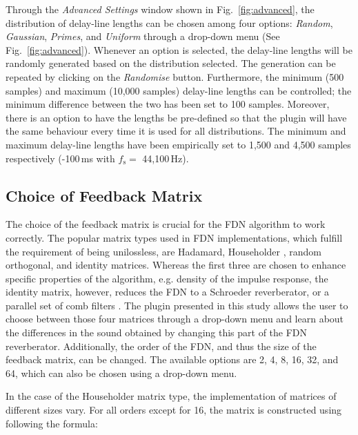 \documentclass[twoside,a4paper]{article}
\newcommand{\silvin}[1]{\textcolor{ForestGreen}{#1}}
\begin{document}
Through the \textit{Advanced Settings} window shown in Fig.~\ref{fig:advanced}, the distribution of delay-line lengths can be chosen among four options: \textit{Random}, \textit{Gaussian}, \textit{Primes}, and \textit{Uniform} through a drop-down menu (See Fig.~\ref{fig:advanced}). Whenever an option is selected, the delay-line lengths will be randomly generated based on the distribution selected. The generation can be repeated by clicking on the \textit{Randomise} button. Furthermore, the minimum (500 samples) and maximum (10,000 samples) delay-line lengths can be controlled; the minimum difference between the two has been set to 100 samples. 
Moreover, there is an option to have the lengths be pre-defined so that the plugin will have the same behaviour every time it is used for all distributions. The minimum and maximum delay-line lengths have been empirically set to 1,500 and 4,500 samples respectively (-100\,ms with $f_\text{s} =$  44,100\,Hz).


\subsection{Choice of Feedback Matrix}

The choice of the feedback matrix is crucial for the FDN algorithm to work correctly. The popular matrix types used in FDN implementations, which fulfill the requirement of being unilossless, are Hadamard, Householder \cite{Jot:1997:icm}, random orthogonal, and identity matrices. Whereas the first three are chosen to enhance specific properties of the algorithm, e.g. density of the impulse response, the identity matrix, however, reduces the FDN to a Schroeder reverberator, or a parallel set of comb filters \cite{Jot:Chaine:1991:aes, menzer2010unitary}. The plugin presented in this study allows the user to choose between those four matrices through a drop-down menu and learn about the differences in the sound obtained by changing this part of the FDN reverberator. %
%
Additionally, the order of the FDN, and thus the size of the feedback matrix, can be changed. The available options are 2, 4, 8, 16, 32, and 64, which can also be chosen using a drop-down menu. %

In the case of the Householder matrix type, the implementation of matrices of different sizes vary. For all orders except for 16, the matrix is constructed using following the formula:
\end{document}
